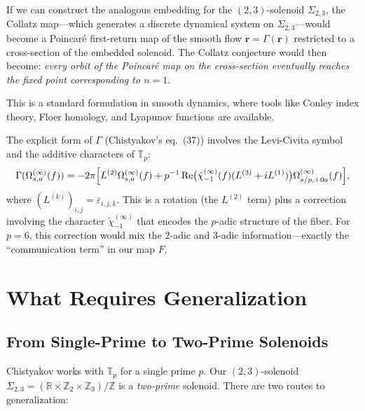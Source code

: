 \documentclass[11pt,a4paper]{article}
\newcommand{\Z}{\mathbb{Z}}
\newcommand{\R}{\mathbb{R}}
\newcommand{\T}{\mathbb{T}}
\theoremstyle{plain}
\theoremstyle{definition}
\begin{document}
\begin{keyinsight}
    If we can construct the analogous embedding for the $(2,3)$-solenoid $\Sigma_{2,3}$, the Collatz map---which generates a discrete dynamical system on $\Sigma_{2,3}$---would become a Poincar\'e first-return map of the smooth flow $\dot{\mathbf{r}} = \Gamma(\mathbf{r})$ restricted to a cross-section of the embedded solenoid. The Collatz conjecture would then become: \emph{every orbit of the Poincar\'e map on the cross-section eventually reaches the fixed point corresponding to $n = 1$}.

    This is a standard formulation in smooth dynamics, where tools like Conley index theory, Floer homology, and Lyapunov functions are available.
\end{keyinsight}

The explicit form of $\Gamma$ (Chistyakov's eq.~(37)) involves the Levi-Civita symbol and the additive characters of $\T_p$:
\begin{equation}
    \Gamma(\Omega_{s,a}^{(\infty)}(f))
    = -2\pi\Bigl[
    L^{(2)}\Omega_{s,a}^{(\infty)}(f)
    + p^{-1}\operatorname{Re}\bigl(
    \tilde{\chi}_{-1}^{(\infty)}(f)(L^{(3)} + iL^{(1)})
    \bigr)\Omega_{s/p,+0a}^{(\infty)}(f)
    \Bigr],
\end{equation}
where $(L^{(k)})_{i,j} = \varepsilon_{i,j,k}$. This is a rotation (the $L^{(2)}$ term) plus a correction involving the character $\tilde{\chi}_{-1}^{(\infty)}$ that encodes the $p$-adic structure of the fiber. For $p = 6$, this correction would mix the $2$-adic and $3$-adic information---exactly the ``communication term'' in our map $F$.


\section{What Requires Generalization}\label{sec:generalize}

\subsection{From Single-Prime to Two-Prime Solenoids}

Chistyakov works with $\T_p$ for a single prime $p$. Our $(2,3)$-solenoid $\Sigma_{2,3} = (\R \times \Z_2 \times \Z_3)/\Z$ is a \emph{two-prime} solenoid. There are two routes to generalization:
\end{document}
